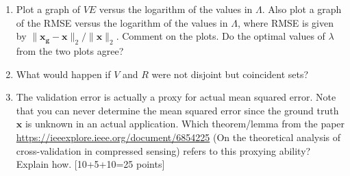 \documentclass[11pt]{article}
\begin{document}
\begin{enumerate}
\begin{enumerate}
\item Plot a graph of $VE$ versus the logarithm of the values in $\Lambda$.  Also plot a graph of the RMSE versus the logarithm of the values in $\Lambda$, where RMSE is given by $\|\boldsymbol{x_g} - \boldsymbol{x}\|_2 / \|\boldsymbol{x}\|_2$. Comment on the plots. Do the optimal values of $\lambda$ from the two plots agree?
\item What would happen if $V$ and $R$ were not disjoint but coincident sets? 
\item The validation error is actually a proxy for actual mean squared error. Note that you can never determine the mean squared error since the ground truth $\boldsymbol{x}$ is unknown in an actual application. Which theorem/lemma from the paper \url{https://ieeexplore.ieee.org/document/6854225} (On the theoretical analysis of cross-validation in compressed sensing) refers to this proxying ability? Explain how.  \textsf{[10+5+10=25 points]}
\end{enumerate}



\end{enumerate}
\end{document}
